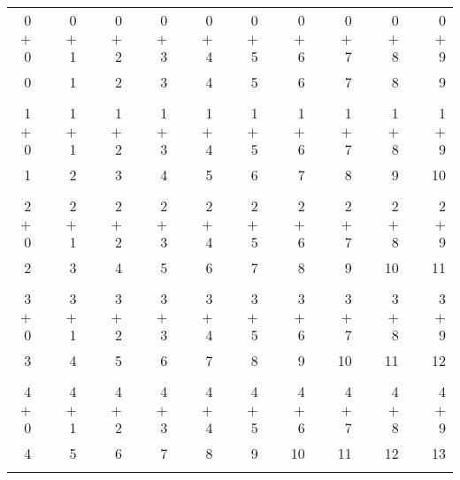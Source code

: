 \documentclass[12pt, letterpaper]{article}
\begin{document}
\begin{tabular}{rrrrrrrrrrrrrrrrrrr}
0 & & 0 & & 0 & & 0 & & 0 & & 0 & & 0 & & 0 & & 0 & & 0\\
$+$ 0 & & $+$ 1 & & $+$ 2 & & $+$ 3 & & $+$ 4 & & $+$ 5 & & $+$ 6 & & $+$ 7 & & $+$ 8 & & $+$ 9\\
\cline{1-1} \cline{3-3} \cline{5-5} \cline{7-7} \cline{9-9} \cline{11-11} \cline{13-13} \cline{15-15} \cline{17-17} \cline{19-19} 0 & & 1 & & 2 & & 3 & & 4 & & 5 & & 6 & & 7 & & 8 & & 9\\ \\
1 & & 1 & & 1 & & 1 & & 1 & & 1 & & 1 & & 1 & & 1 & & 1\\
$+$ 0 & & $+$ 1 & & $+$ 2 & & $+$ 3 & & $+$ 4 & & $+$ 5 & & $+$ 6 & & $+$ 7 & & $+$ 8 & & $+$ 9\\
\cline{1-1} \cline{3-3} \cline{5-5} \cline{7-7} \cline{9-9} \cline{11-11} \cline{13-13} \cline{15-15} \cline{17-17} \cline{19-19} 1 & & 2 & & 3 & & 4 & & 5 & & 6 & & 7 & & 8 & & 9 & & 10\\ \\
2 & & 2 & & 2 & & 2 & & 2 & & 2 & & 2 & & 2 & & 2 & & 2\\
$+$ 0 & & $+$ 1 & & $+$ 2 & & $+$ 3 & & $+$ 4 & & $+$ 5 & & $+$ 6 & & $+$ 7 & & $+$ 8 & & $+$ 9\\
\cline{1-1} \cline{3-3} \cline{5-5} \cline{7-7} \cline{9-9} \cline{11-11} \cline{13-13} \cline{15-15} \cline{17-17} \cline{19-19} 2 & & 3 & & 4 & & 5 & & 6 & & 7 & & 8 & & 9 & & 10 & & 11\\ \\
3 & & 3 & & 3 & & 3 & & 3 & & 3 & & 3 & & 3 & & 3 & & 3\\
$+$ 0 & & $+$ 1 & & $+$ 2 & & $+$ 3 & & $+$ 4 & & $+$ 5 & & $+$ 6 & & $+$ 7 & & $+$ 8 & & $+$ 9\\
\cline{1-1} \cline{3-3} \cline{5-5} \cline{7-7} \cline{9-9} \cline{11-11} \cline{13-13} \cline{15-15} \cline{17-17} \cline{19-19} 3 & & 4 & & 5 & & 6 & & 7 & & 8 & & 9 & & 10 & & 11 & & 12\\ \\
4 & & 4 & & 4 & & 4 & & 4 & & 4 & & 4 & & 4 & & 4 & & 4\\
$+$ 0 & & $+$ 1 & & $+$ 2 & & $+$ 3 & & $+$ 4 & & $+$ 5 & & $+$ 6 & & $+$ 7 & & $+$ 8 & & $+$ 9\\
\cline{1-1} \cline{3-3} \cline{5-5} \cline{7-7} \cline{9-9} \cline{11-11} \cline{13-13} \cline{15-15} \cline{17-17} \cline{19-19} 4 & & 5 & & 6 & & 7 & & 8 & & 9 & & 10 & & 11 & & 12 & & 13\\ \\

\end{tabular}
\end{document}
